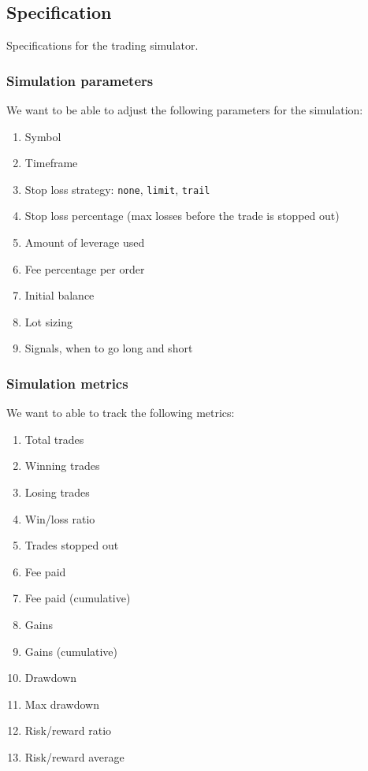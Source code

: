 \documentclass[11pt]{article}
\providecommand{\tightlist}{%
      \setlength{\itemsep}{0pt}\setlength{\parskip}{0pt}}
\begin{document}
    \hypertarget{specification}{%
\subsection{Specification}\label{specification}}

    Specifications for the trading simulator.

    \hypertarget{simulation-parameters}{%
\subsubsection{Simulation parameters}\label{simulation-parameters}}

    We want to be able to adjust the following parameters for the
simulation:

\begin{enumerate}
\def\labelenumi{\arabic{enumi}.}
\tightlist
\item
  Symbol
\item
  Timeframe
\item
  Stop loss strategy: \texttt{none}, \texttt{limit}, \texttt{trail}
\item
  Stop loss percentage (max losses before the trade is stopped out)
\item
  Amount of leverage used
\item
  Fee percentage per order
\item
  Initial balance
\item
  Lot sizing
\item
  Signals, when to go long and short
\end{enumerate}

    \hypertarget{simulation-metrics}{%
\subsubsection{Simulation metrics}\label{simulation-metrics}}

    We want to able to track the following metrics:

\begin{enumerate}
\def\labelenumi{\arabic{enumi}.}
\tightlist
\item
  Total trades
\item
  Winning trades
\item
  Losing trades
\item
  Win/loss ratio
\item
  Trades stopped out
\item
  Fee paid
\item
  Fee paid (cumulative)
\item
  Gains
\item
  Gains (cumulative)
\item
  Drawdown
\item
  Max drawdown
\item
  Risk/reward ratio
\item
  Risk/reward average
\end{enumerate}
\end{document}

